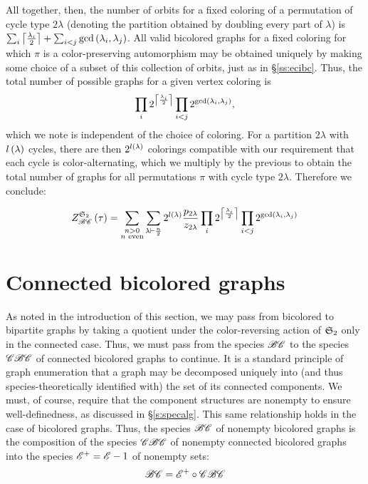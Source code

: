 \documentclass[distribution,draft]{brandiss} %
\numberwithin{section}{chapter}
\numberwithin{figure}{chapter}
\begin{document}
All together, then, the number of orbits for a fixed coloring of a permutation of cycle type $2 \lambda$ (denoting the partition obtained by doubling every part of $\lambda$) is $\sum_{i} \left\lceil {\frac{\lambda_{i}}{2}} \right\rceil + \sum_{i < j} \gcd \left( {\lambda_{i}, \lambda_{j}} \right)$.
All valid bicolored graphs for a fixed coloring for which $\pi$ is a color-preserving automorphism may be obtained uniquely by making some choice of a subset of this collection of orbits, just as in \S \ref{ss:ecibc}.
Thus, the total number of possible graphs for a given vertex coloring is
\begin{equation*}
  \prod_{i} 2^{\left\lceil {\frac{\lambda_{i}}{2}} \right\rceil} \prod_{i < j} 2^{\gcd \left( {\lambda_{i}, \lambda_{j}} \right)},
\end{equation*}
which we note is independent of the choice of coloring.
For a partition $2\lambda$ with $l \left( {\lambda} \right)$ cycles, there are then $2^{l \left( {\lambda} \right)}$ colorings compatible with our requirement that each cycle is color-alternating, which we multiply by the previous to obtain the total number of graphs for all permutations $\pi$ with cycle type $2 \lambda$.
Therefore we conclude:
\begin{theorem}
  \begin{equation}
    \label{eq:tcibc}
    \gcielt{\symgp{2}}{\specname{BC}}{\tau} = \sum_{\substack{n > 0 \\ \text{$n$ even}}} \sum_{\lambda \vdash \frac{n}{2}} 2^{l \pbrac{\lambda}} \frac{p_{2 \lambda}}{z_{2 \lambda}} \prod_{i} 2^{\ceil{\frac{\lambda_{i}}{2}}} \prod_{i < j} 2^{\gcd \pbrac{\lambda_{i}, \lambda_{j}}}
  \end{equation}
\end{theorem}

\section{Connected bicolored graphs}\label{s:cbc}
As noted in the introduction of this section, we may pass from bicolored to bipartite graphs by taking a quotient under the color-reversing action of $ \mathfrak{S}_{2} $ only in the connected case.
Thus, we must pass from the species $\mathscr{BC}$ to the species $\mathscr{CBC}$ of connected bicolored graphs to continue.
It is a standard principle of graph enumeration that a graph may be decomposed uniquely into (and thus species-theoretically identified with) the set of its connected components.
We must, of course, require that the component structures are nonempty to ensure well-definedness, as discussed in \S \ref{s:specalg}.
This same relationship holds in the case of bicolored graphs.
Thus, the species $\mathscr{BC}$ of nonempty bicolored graphs is the composition of the species $\mathscr{CBC}$ of nonempty connected bicolored graphs into the species $\mathscr{E}^{+} = \mathscr{E} - 1$ of nonempty sets:
\begin{equation} \mathscr{BC} = \mathscr{E}^{+} \circ \mathscr{CBC} \label{eq:bcdecomp} \end{equation}
\end{document}
